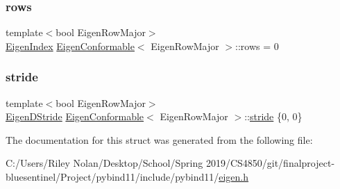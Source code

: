 \mbox{\label{struct_eigen_conformable_a3f4cea0fad3c49cfa1e543d7388af7be}} 
\subsubsection{\texorpdfstring{rows}{rows}}
{\footnotesize\ttfamily template$<$bool Eigen\+Row\+Major$>$ \\
\mbox{\hyperlink{eigen_8h_a4e595ab182718d84a409dd05e0829bdd}{Eigen\+Index}} \mbox{\hyperlink{struct_eigen_conformable}{Eigen\+Conformable}}$<$ Eigen\+Row\+Major $>$\+::rows = 0}

\mbox{\label{struct_eigen_conformable_a956848cb9f7abf1a2e6e31516c362360}} 
\subsubsection{\texorpdfstring{stride}{stride}}
{\footnotesize\ttfamily template$<$bool Eigen\+Row\+Major$>$ \\
\mbox{\hyperlink{eigen_8h_a509c0a3fae790584bf0cfcccef41c784}{Eigen\+D\+Stride}} \mbox{\hyperlink{struct_eigen_conformable}{Eigen\+Conformable}}$<$ Eigen\+Row\+Major $>$\+::\mbox{\hyperlink{_s_d_l__opengl__glext_8h_a743715bb319dd426e85b9774559cc0ea}{stride}} \{0, 0\}}



The documentation for this struct was generated from the following file\+:\begin{DoxyCompactItemize}
\item 
C\+:/\+Users/\+Riley Nolan/\+Desktop/\+School/\+Spring 2019/\+C\+S4850/git/finalproject-\/bluesentinel/\+Project/pybind11/include/pybind11/\mbox{\hyperlink{eigen_8h}{eigen.\+h}}\end{DoxyCompactItemize}
